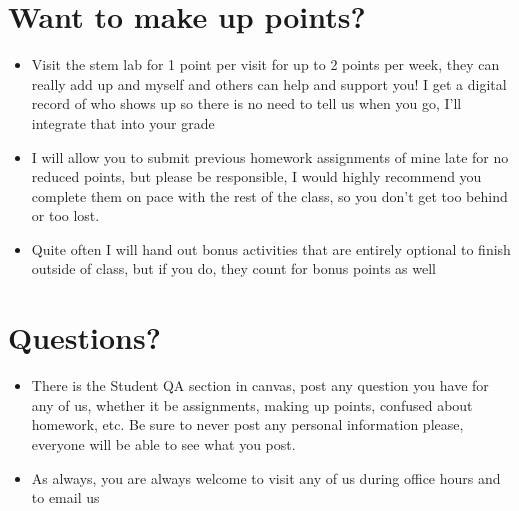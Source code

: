 \documentclass{article}
\begin{document}
\section*{Want to make up points?}
\begin{itemize}
    \item Visit the stem lab for 1 point per visit for up to 2 points per week, they can really add up and myself and others can help and support you! I get a digital record of who shows up so there is no need to tell us when you go, I’ll integrate that into your grade
    \item I will allow you to submit previous homework assignments of mine late for no reduced points, but please be responsible, I would highly recommend you complete them on pace with the rest of the class, so you don’t get too behind or too lost.  
    \item Quite often I will hand out bonus activities that are entirely optional to finish outside of class, but if you do, they count for bonus points as well
\end{itemize}
\section*{Questions?}
\begin{itemize}
\item          There is the Student QA section in canvas, post any question you have for any of us, whether it be assignments, making up points, confused about homework, etc. Be sure to never post any personal information please, everyone will be able to see what you post.
\item         As always, you are always welcome to visit any of us during office hours and to email us
\end{itemize}
\end{document}
